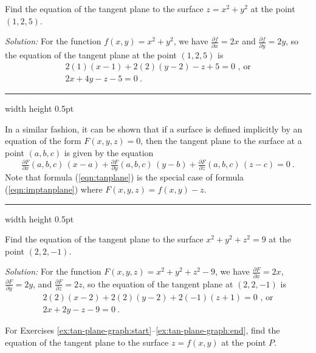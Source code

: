 \begin{exmp}
 Find the equation of the tangent plane to the surface $z =  x^2 + y^2$ at the point $(1,2,5)$.\smallskip
 \par\noindent \emph{Solution:} For the function $f(x,y) = x^2 + y^2$, we have
 $\tfrac{\partial f}{\partial x} = 2x$ and $\tfrac{\partial f}{\partial y} = 2y$, so the equation of the tangent plane
 at the point $(1,2,5)$ is
 \begin{gather*}
  2(1)(x-1)+2(2)(y-2)-z+5=0 \text{~,~or}\\
  2x+4y-z-5=0 ~.
 \end{gather*}
\end{exmp}
\hrule width \textwidth height 0.5pt
\medskip

In a similar fashion, it can be shown that if a surface is defined implicitly by an equation of the form
$F(x,y,z)=0$, then the tangent plane to the surface at a point $(a,b,c)$ is given by the equation
\begin{equation}\label{eqn:imptanplane}
 \tfrac{\partial F}{\partial x}(a,b,c)\,(x-a) + \tfrac{\partial F}{\partial y}(a,b,c)\,(y-b) +
 \tfrac{\partial F}{\partial z}(a,b,c)\,(z-c) = 0 ~.
\end{equation}
Note that formula (\ref{eqn:tanplane}) is the special case of formula (\ref{eqn:imptanplane}) where
$F(x,y,z) = f(x,y) - z$.
\medskip
\hrule width \textwidth height 0.5pt
\begin{exmp}
 Find the equation of the tangent plane to the surface $x^2 + y^2 + z^2 = 9$ at the point $(2,2,-1)$.\smallskip
 \par\noindent \emph{Solution:} For the function $F(x,y,z) = x^2 + y^2 + z^2 - 9$, we have
 $\tfrac{\partial F}{\partial x} = 2x$, $\tfrac{\partial F}{\partial y} = 2y$, and
 $\tfrac{\partial F}{\partial z} = 2z$, so the equation of the tangent plane at $(2,2,-1)$ is
 \begin{gather*}
  2(2)(x-2)+2(2)(y-2)+2(-1)(z+1)=0 \text{~,~or}\\
  2x+2y-z-9=0 ~.
 \end{gather*}
\end{exmp}
\startexercises\label{sec2dot3}
\par\noindent For Exercises \ref{ex:tan-plane-graph:start}--\ref{ex:tan-plane-graph:end}, find the equation of the tangent plane to the surface $z=f(x,y)$ at the point
$P$.
